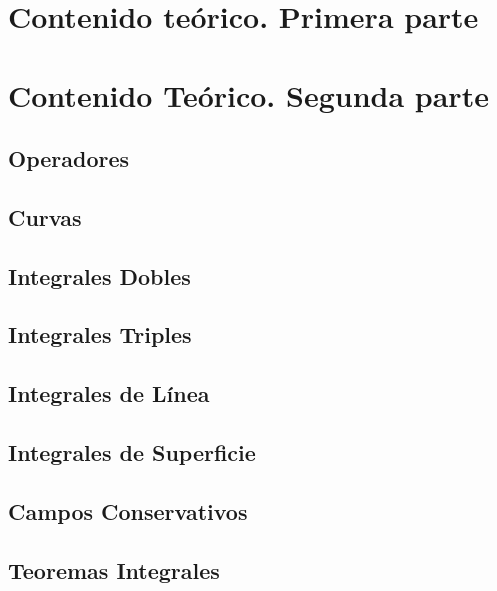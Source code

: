 \documentclass[10pt, a4paper]{report}
\theoremstyle{definition} %
\begin{document}
    \chapter{Contenido teórico. Primera parte}

    \chapter{Contenido Teórico. Segunda parte}
        \section{Operadores}
            
        \section{Curvas}
            
        \section{Integrales Dobles} 
            
        \section{Integrales Triples}
            
        \section{Integrales de L\'inea}
            
        \section{Integrales de Superficie}
        \section{Campos Conservativos}
            
        \section{Teoremas Integrales}
            

\end{document}
